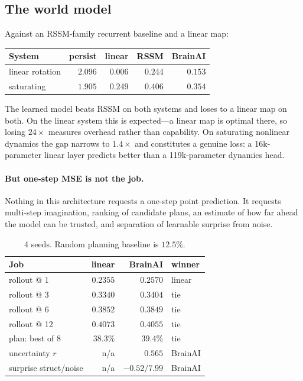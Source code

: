 \documentclass[10pt,twocolumn]{article}
\begin{document}
\subsection{The world model}

Against an RSSM-family recurrent baseline and a linear map:

\begin{table}[h]
\centering\small
\begin{tabular}{@{}lrrrr@{}}
\toprule
System & persist & linear & RSSM & BrainAI \\
\midrule
linear rotation & $2.096$ & $\mathbf{0.006}$ & $0.244$ & $0.153$ \\
saturating & $1.905$ & $\mathbf{0.249}$ & $0.406$ & $0.354$ \\
\bottomrule
\end{tabular}
\end{table}

The learned model beats RSSM on both systems and loses to a linear map on both.
On the linear system this is expected---a linear map is optimal there, so
losing $24\times$ measures overhead rather than capability. On saturating
nonlinear dynamics the gap narrows to $1.4\times$ and constitutes a genuine
loss: a 16k-parameter linear layer predicts better than a 119k-parameter
dynamics head.

\paragraph{But one-step MSE is not the job.} Nothing in this architecture
requests a one-step point prediction. It requests multi-step imagination,
ranking of candidate plans, an estimate of how far ahead the model can be
trusted, and separation of learnable surprise from noise.

\begin{table}[h]
\centering\small
\begin{tabular}{@{}lrrl@{}}
\toprule
Job & linear & BrainAI & winner \\
\midrule
rollout @ 1 & $\mathbf{0.2355}$ & $0.2570$ & linear \\
rollout @ 3 & $0.3340$ & $0.3404$ & tie \\
rollout @ 6 & $0.3852$ & $0.3849$ & tie \\
rollout @ 12 & $0.4073$ & $0.4055$ & tie \\
plan: best of 8 & $38.3\%$ & $39.4\%$ & tie \\
uncertainty $r$ & n/a & $\mathbf{0.565}$ & BrainAI \\
surprise struct/noise & n/a & $-0.52/7.99$ & BrainAI \\
\bottomrule
\end{tabular}
\caption{4 seeds. Random planning baseline is $12.5\%$.}
\end{table}
\end{document}
